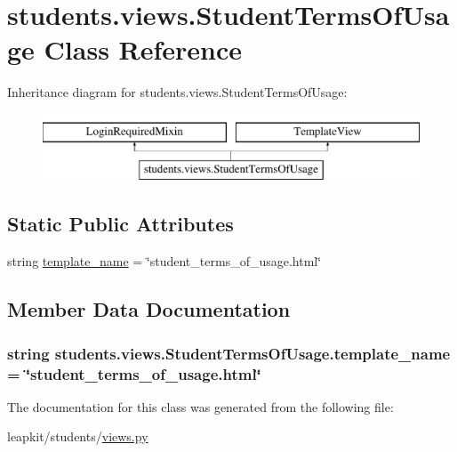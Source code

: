 \hypertarget{classstudents_1_1views_1_1_student_terms_of_usage}{\section{students.\-views.\-Student\-Terms\-Of\-Usage Class Reference}
\label{classstudents_1_1views_1_1_student_terms_of_usage}
}
Inheritance diagram for students.\-views.\-Student\-Terms\-Of\-Usage\-:\begin{figure}[H]
\begin{center}
\leavevmode
\includegraphics[height=2.000000cm]{classstudents_1_1views_1_1_student_terms_of_usage}
\end{center}
\end{figure}
\subsection*{Static Public Attributes}
\begin{DoxyCompactItemize}
\item 
string \hyperlink{classstudents_1_1views_1_1_student_terms_of_usage_a6dbb8b09152cd323df8fc4a841cb409b}{template\-\_\-name} = \char`\"{}student\-\_\-terms\-\_\-of\-\_\-usage.\-html\char`\"{}
\end{DoxyCompactItemize}


\subsection{Member Data Documentation}
\hypertarget{classstudents_1_1views_1_1_student_terms_of_usage_a6dbb8b09152cd323df8fc4a841cb409b}{
\subsubsection[{template\-\_\-name}]{\setlength{\rightskip}{0pt plus 5cm}string students.\-views.\-Student\-Terms\-Of\-Usage.\-template\-\_\-name = \char`\"{}student\-\_\-terms\-\_\-of\-\_\-usage.\-html\char`\"{}\hspace{0.3cm}{\ttfamily [static]}}}\label{classstudents_1_1views_1_1_student_terms_of_usage_a6dbb8b09152cd323df8fc4a841cb409b}


The documentation for this class was generated from the following file\-:\begin{DoxyCompactItemize}
\item 
leapkit/students/\hyperlink{views_8py}{views.\-py}\end{DoxyCompactItemize}
